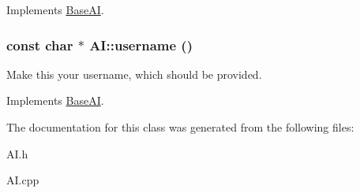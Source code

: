 Implements \hyperlink{classBaseAI_ad60148e7e9e450ce47432b07b4db1ed6}{BaseAI}.

\hypertarget{classAI_a529ac74a6f88a82abb1edd87847203e1}{
\subsubsection[{username}]{\setlength{\rightskip}{0pt plus 5cm}const char $\ast$ AI::username ()}}
\label{classAI_a529ac74a6f88a82abb1edd87847203e1}
Make this your username, which should be provided. 

Implements \hyperlink{classBaseAI_aef082fbf306fec04515ed5ed3b1ba582}{BaseAI}.



The documentation for this class was generated from the following files:\begin{DoxyCompactItemize}
\item 
AI.h\item 
AI.cpp\end{DoxyCompactItemize}
